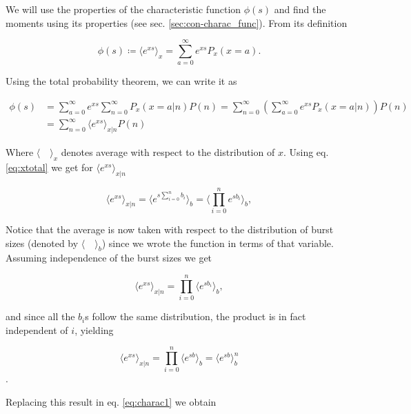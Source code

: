 
We will use the properties of the characteristic function $\phi(s)$ and find the moments using its properties (see sec. \ref{sec:con-charac_func}). From its definition

\begin{equation*}
  \phi(s) \coloneqq \langle e^{xs}\rangle_x = \sum_{a=0}^\infty e^{xs}P_x(x=a).
\end{equation*}

Using the total probability theorem, we can write it as

\begin{equation}
  \label{eq:charac1}
  \begin{split}
    \phi(s) &= \sum_{a=0}^\infty e^{xs}\sum_{n=0}^\infty P_x(x=a|n)P(n) = \sum_{n=0}^\infty\left(\sum_{a=0}^\infty e^{xs}P_x(x=a|n)\right)P(n)\\ 
&= \sum_{n=0}^\infty \langle e^{xs}\rangle_{x|n} P(n)
  \end{split}
\end{equation}

Where $\langle\quad\rangle_x$ denotes average with respect to the distribution of $x$. Using eq. \eqref{eq:xtotal} we get for $\langle e^{xs}\rangle_{x|n}$

\begin{equation*}
  \langle e^{xs}\rangle_{x|n} = \langle e^{s\sum_{i=0}^nb_i} \rangle_b = \langle \prod_{i=0}^ne^{sb_i}\rangle_b,
\end{equation*}

Notice that the average is now taken with respect to the distribution of burst sizes (denoted by $\langle\quad \rangle_b$) since we wrote the function in terms of that variable. Assuming independence of the burst sizes we get

\begin{equation*}
  \langle e^{xs}\rangle_{x|n} =  \prod_{i=0}^n\langle e^{sb_i}\rangle_b,
\end{equation*}

and since all the $b_i$s follow the same distribution, the product is in fact independent of $i$, yielding

\begin{equation*}
  \langle e^{xs}\rangle_{x|n} = \prod_{i=0}^n\langle e^{sb}\rangle_b = \langle e^{sb}\rangle_b^n
\end{equation*}.

Replacing this result in eq. \eqref{eq:charac1} we obtain

